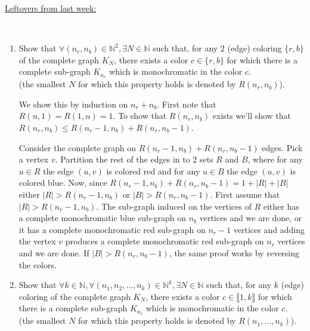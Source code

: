 \documentclass[a4paper,11pt]{exam}
\begin{document}
\begin{center}

\underline{Leftovers from last week:}
\end{center}

~\vspace{-0.6cm}
\begin{enumerate}
	\item Show that $\forall (n_r,n_b)\in\mathbb{N}^2, \exists N\in\mathbb{N}$
	such that, for any $2$ (edge) coloring $\{r,b\}$ of the complete graph
	$K_N$, there exists a color $c\in\{r,b\}$ for which there is a complete sub-graph $K_{n_c}$ which is monochromatic in the color $c$.
	\\
	(the smallest $N$ for which this property holds is denoted by $R(n_r,n_b)$).
	
	\begin{solution}
		We show this by induction on $n_r + n_b$. First note that $R(n,1) = R(1,n)=1$.
		To show that $R(n_r,n_b)$ exists we'll show that $R(n_r, n_b) \leq R(n_r-1, n_b) + R(n_r, n_b-1)$. 
		
		Consider the complete graph on $ R(n_r-1, n_b) + R(n_r, n_b-1) $ edges. Pick a vertex $v$. Partition the rest of the edges in to 2 sets $R$ and $B$, where for any $u\in R$ the edge $(u,v)$ is colored red and for any $u\in B$ the edge $(u,v)$ is colored blue. Now, since $ R(n_r-1, n_b) + R(n_r, n_b-1) = 1 + |R|+|B|$ either $|R|>R(n_r-1, n_b)$ or $|B|>R(n_r, n_b-1)$. First assume that $|R|>R(n_r-1, n_b)$. The sub-graph induced on the vertices of $ R $ either has a complete monochromatic blue sub-graph on $ n_b $ vertices and we are done, or it has a complete monochromatic red sub-graph on $ n_r-1 $ vertices and adding the vertex $v$ produces a complete monochromatic red sub-graph on $ n_r $ vertices and we are done. If $|B|>R(n_r, n_b-1)$, the same proof works by reversing the colors.
	\end{solution}
	
	\item Show that $\forall k\in\mathbb{N},\forall (n_1, n_2, \dots,
	n_k)\in\mathbb{N}^k, \exists N\in\mathbb{N}$ such that, for any $k$ (edge) coloring of the complete graph $K_N$, there exists a color $c\in\llbracket 1,k \rrbracket$ for which there is a complete sub-graph $K_{n_c}$ which is monochromatic in the color $c$.
	\\ (the smallest $N$ for which this property holds is denoted by $R(n_1,\dots,n_k)$).
	

\end{enumerate}
\end{document}
